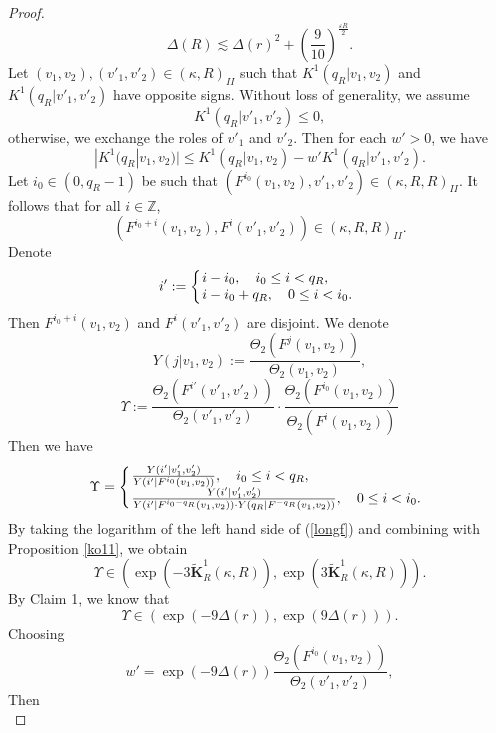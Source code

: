 \documentclass{amsart}
\theoremstyle{definition}
\begin{document}
\begin{proof}
\begin{equation}\label{kaka}
\Delta(R)\lesssim \Delta(r)^2+(\frac{9}{10})^{\frac{\varepsilon R}{2}}.
\end{equation}
Let $(v_1,v_2),(v'_1,v'_2)\in (\kappa,R)_{II}$ such that $K^1(q_R|v_1,v_2)$ and $K^1(q_R|v'_1,v'_2)$ have opposite signs. Without loss of generality, we assume \[K^1(q_R|v'_1,v'_2)\leq 0,\]otherwise, we exchange the roles of $v'_1$ and $v'_2$. Then for each $w'>0$, we have
\begin{equation}
|K^1(q_R|v_1,v_2)|\leq K^1(q_R|v_1,v_2)-w'K^1(q_R|v'_1,v'_2).
\end{equation}
Let $i_0\in (0,q_R-1)$ be such that $(F^{i_0}(v_1,v_2),v'_1,v'_2)\in (\kappa,R,R)_{II}$. It follows that for all $i\in \mathbb{Z}$,
\[(F^{i_0+i}(v_1,v_2),F^{i}(v'_1,v'_2))\in (\kappa,R,R)_{II}.\]
Denote
\[i':=\left\{\begin{array}{ll}
	\hspace{-0.4em}i-i_0,\quad i_0\leq i<q_R,\\
	\hspace{-0.4em} i-i_0+q_R,\quad 0\leq i<i_0.
\end{array}\right.\]
Then $F^{i_0+i}(v_1,v_2)$ and $F^{i}(v'_1,v'_2)$ are disjoint. We denote
\[Y(j|v_1,v_2):=\frac{\Theta_2(F^j(v_1,v_2))}{\Theta_2(v_1,v_2)},\]
{\[\Upsilon:=\frac{\Theta_2(F^{i'}(v'_1,v'_2))}{\Theta_2(v'_1,v'_2)}\cdot\frac{\Theta_2(F^{i_0}(v_1,v_2))}{\Theta_2(F^{i}(v_1,v_2))}\]}Then we have
\begin{equation}\label{longf}
\Upsilon=\left\{\begin{array}{ll}
	\hspace{-0.4em}\frac{Y(i'|v'_1,v'_2)}{Y(i'|F^{i_0}(v_1,v_2))},\quad i_0\leq i<q_R,\\
	\hspace{-0.4em} \frac{Y(i'|v'_1,v'_2)}{Y(i'|F^{i_0-q_R}(v_1,v_2))\cdot Y(q_R|F^{-q_R}(v_1,v_2))},\quad 0\leq i<i_0.
\end{array}\right.
\end{equation}
By taking the logarithm of the left hand side of (\ref{longf}) and combining with Proposition \ref{ko11}, we obtain
\[\Upsilon\in \left(\exp(-3\widetilde{\mathbf{K}}_R^1(\kappa,R)),\exp(3\widetilde{\mathbf{K}}_R^1(\kappa,R))\right).\]
By Claim 1, we know that
\[\Upsilon\in \left(\exp(-9\Delta(r)),\exp(9\Delta(r))\right).\]
Choosing
\[w'=\exp(-9\Delta(r))\frac{\Theta_2(F^{i_0}(v_1,v_2))}{\Theta_2(v'_1,v'_2)},\]
Then
\begin{equation}\label{midex}

\end{equation}
\end{proof}
\end{document}
